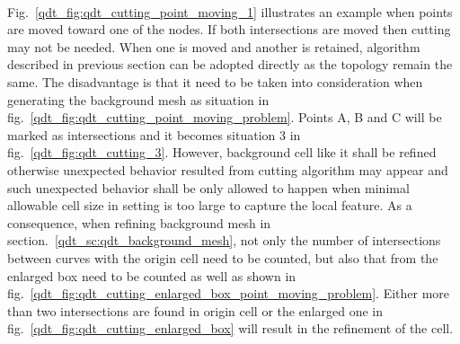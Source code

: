 \paragraph{}
Fig.~\ref{qdt_fig:qdt_cutting_point_moving_1} illustrates an example when points are moved toward one of the nodes.
If both intersections are moved then cutting may not be needed.
When one is moved and another is retained, algorithm described in previous section can be adopted directly as the topology remain the same.
The disadvantage is that it need to be taken into consideration when generating the background mesh as situation in fig.~\ref{qdt_fig:qdt_cutting_point_moving_problem}.
Points A, B and C will be marked as intersections and it becomes situation 3 in fig.~\ref{qdt_fig:qdt_cutting_3}.
However, background cell like it shall be refined otherwise unexpected behavior resulted from cutting algorithm may appear and such unexpected behavior shall be only allowed to happen when minimal allowable cell size in setting is too large to capture the local feature.
As a consequence, when refining background mesh in section.~\ref{qdt_sc:qdt_background_mesh}, not only the number of intersections between curves with the origin cell need to be counted, but also that from the enlarged box need to be counted as well as shown in fig.~\ref{qdt_fig:qdt_cutting_enlarged_box_point_moving_problem}.
Either more than two intersections are found in origin cell or the enlarged one in fig.~\ref{qdt_fig:qdt_cutting_enlarged_box} will result in the refinement of the cell.
